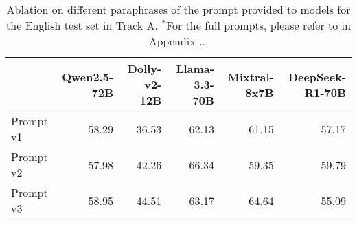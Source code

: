\begin{table*}
\centering
\begin{tabular}{lrrrrr}
\toprule
 & Qwen2.5-72B & Dolly-v2-12B & Llama-3.3-70B & Mixtral-8x7B & DeepSeek-R1-70B \\
\midrule
Prompt v1 & 58.29 & 36.53 & 62.13 & 61.15 & 57.17 \\
Prompt v2 & 57.98 & 42.26 & 66.34 & 59.35 & 59.79 \\
Prompt v3 & 58.95 & 44.51 & 63.17 & 64.64 & 55.09 \\
\bottomrule
\end{tabular}
\caption{Ablation on different paraphrases of the prompt provided to models for the English test set in Track A. $^*$For the full prompts, please refer to  in Appendix ...}
\label{tab:ablation-prompt-variants}
\end{table*}